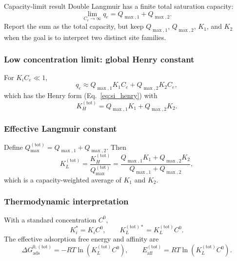 \documentclass[journal=jacsat,manuscript=article]{achemso}
\begin{document}
\begin{greenbox}{Capacity-limit result}
	Double Langmuir has a finite total saturation capacity:
	\begin{equation}
		\lim_{C_e \to \infty} q_e = Q_{\max,1} + Q_{\max,2}.
	\end{equation}
	Report the sum as the total capacity, but keep \(Q_{\max,1}\),
	\(Q_{\max,2}\), \(K_1\), and \(K_2\) when the goal is to interpret
	two distinct site families.
\end{greenbox}

\subsubsection{Low concentration limit: global Henry constant}

For \(K_i C_e \ll 1\),
\begin{equation}
	q_e \approx Q_{\max,1} K_1 C_e + Q_{\max,2} K_2 C_e,
\end{equation}
which has the Henry form (Eq.~\eqref{eq:si_henry}) with
\begin{equation}
	K_H^{\mathrm{(tot)}}
	= Q_{\max,1} K_1 + Q_{\max,2} K_2.
\end{equation}


\subsubsection{Effective Langmuir constant}

Define \(Q_{\max}^{\mathrm{(tot)}} = Q_{\max,1} + Q_{\max,2}\). Then
\begin{equation}
	K_L^{\mathrm{(tot)}}
	= \frac{K_H^{\mathrm{(tot)}}}{Q_{\max}^{\mathrm{(tot)}}}
	= \frac{Q_{\max,1} K_1 + Q_{\max,2} K_2}
	{Q_{\max,1} + Q_{\max,2}},
\end{equation}
which is a capacity-weighted average of \(K_1\) and \(K_2\).

\subsubsection{Thermodynamic interpretation}

With a standard concentration \(C^0\),
\begin{equation}
	K_i^{\ast} = K_i C^0,
	\qquad
	K_L^{\mathrm{(tot)}\ast} = K_L^{\mathrm{(tot)}} C^0.
\end{equation}
The effective adsorption free energy and affinity are
\begin{equation}
	\Delta G_{\mathrm{ads}}^{0,\mathrm{(tot)}}
	= - R T \ln\left( K_L^{\mathrm{(tot)}} C^0 \right),
	\qquad
	E_{\mathrm{aff}}^{\mathrm{(tot)}}
	= R T \ln\left( K_L^{\mathrm{(tot)}} C^0 \right).
\end{equation}
\end{document}
